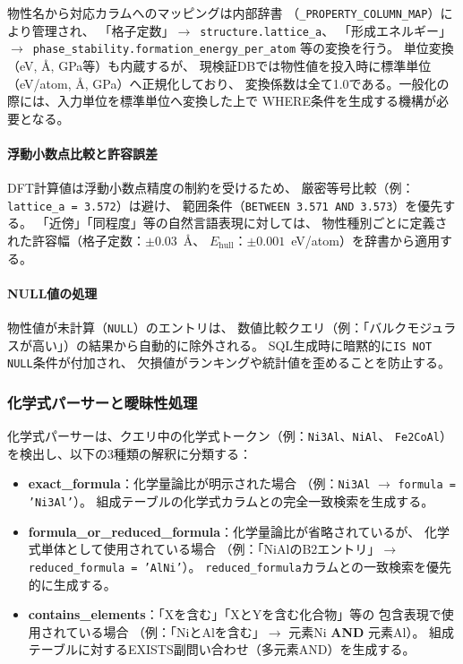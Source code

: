 \documentclass[5p,twocolumn]{elsarticle}
\begin{document}
物性名から対応カラムへのマッピングは内部辞書
（\texttt{\_PROPERTY\_COLUMN\_MAP}）により管理され、
「格子定数」$\to$~\texttt{structure.lattice\_a}、
「形成エネルギー」$\to$~\texttt{phase\_stability.formation\_energy\_per\_atom}
等の変換を行う。
単位変換（eV, Å, GPa等）も内蔵するが、
現検証DBでは物性値を投入時に標準単位（eV/atom, \AA, GPa）へ正規化しており、
変換係数は全て1.0である。一般化の際には、入力単位を標準単位へ変換した上で
WHERE条件を生成する機構が必要となる。

\paragraph{浮動小数点比較と許容誤差}
DFT計算値は浮動小数点精度の制約を受けるため、
厳密等号比較（例：\texttt{lattice\_a = 3.572}）は避け、
範囲条件（\texttt{BETWEEN 3.571 AND 3.573}）を優先する。
「近傍」「同程度」等の自然言語表現に対しては、
物性種別ごとに定義された許容幅（格子定数：$\pm 0.03$~\AA、
$E_\text{hull}$：$\pm 0.001$~eV/atom）を辞書から適用する。

\paragraph{NULL値の処理}
物性値が未計算（\texttt{NULL}）のエントリは、
数値比較クエリ（例：「バルクモジュラスが高い」）の結果から自動的に除外される。
SQL生成時に暗黙的に\texttt{IS NOT NULL}条件が付加され、
欠損値がランキングや統計値を歪めることを防止する。

\subsubsection{化学式パーサーと曖昧性処理}
\label{sec:formula_parser}

化学式パーサーは、クエリ中の化学式トークン（例：\texttt{Ni3Al}、\texttt{NiAl}、
\texttt{Fe2CoAl}）を検出し、以下の3種類の解釈に分類する：

\begin{itemize}
  \item \textbf{exact\_formula}：化学量論比が明示された場合
    （例：\texttt{Ni3Al} $\to$ \texttt{formula = 'Ni3Al'}）。
    組成テーブルの化学式カラムとの完全一致検索を生成する。
  \item \textbf{formula\_or\_reduced\_formula}：化学量論比が省略されているが、
    化学式単体として使用されている場合
    （例：「NiAlのB2エントリ」$\to$ \texttt{reduced\_formula = 'AlNi'}）。
    \texttt{reduced\_formula}カラムとの一致検索を優先的に生成する。
  \item \textbf{contains\_elements}：「Xを含む」「XとYを含む化合物」等の
    包含表現で使用されている場合
    （例：「NiとAlを含む」$\to$ 元素Ni \textbf{AND} 元素Al）。
    組成テーブルに対するEXISTS副問い合わせ（多元素AND）を生成する。
\end{itemize}
\end{document}
